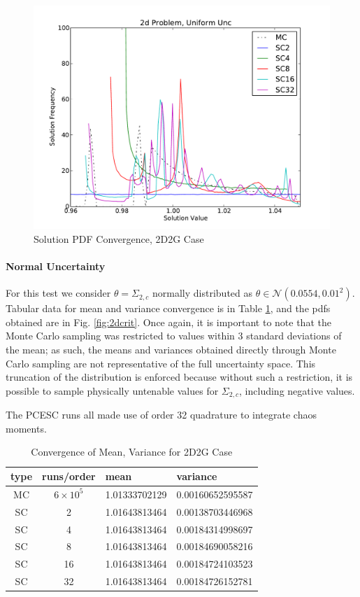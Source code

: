 \begin{figure}[H]
\centering
   \includegraphics[width=\textwidth]{../graphics/2d_uniform_pdfs}
   \caption{Solution PDF Convergence, 2D2G Case}
   \label{fig:2dcrit uni}
\end{figure}

\paragraph{Normal Uncertainty}
For this test we consider $\theta=\Sigma_{2,c}$ normally distributed as $\theta\in\mathcal{N}(0.0554,0.01^2)$. Tabular data for mean and variance convergence is in Table \ref{tab:2dcrit}, and the pdfs obtained are in Fig. \ref{fig:2dcrit}.  Once again, it is important to note that the Monte Carlo sampling was restricted to values within 3 standard deviations of the mean; as such, the means and variances obtained directly through Monte Carlo sampling are not representative of the full uncertainty space.  This truncation of the distribution is enforced because without such a restriction, it is possible to sample physically untenable values for $\Sigma_{2,c}$, including negative values.

The PCESC runs all made use of order 32 quadrature to integrate chaos moments.

\begin{table}[H]
\begin{center}
\begin{tabular}{c c|l l}
type & runs/order & mean & variance \\ \hline
MC & $6\times10^5$ & 1.01333702129 & 0.00160652595587 \\
SC & 2  & 1.01643813464 & 0.00138703446968 \\
SC & 4  & 1.01643813464 & 0.00184314998697 \\
SC & 8  & 1.01643813464 & 0.00184690058216 \\
SC & 16 & 1.01643813464 & 0.00184724103523 \\
SC & 32 & 1.01643813464 & 0.00184726152781
\end{tabular}
\end{center}
\caption{Convergence of Mean, Variance for 2D2G Case}
\label{tab:2dcrit}
\end{table}

